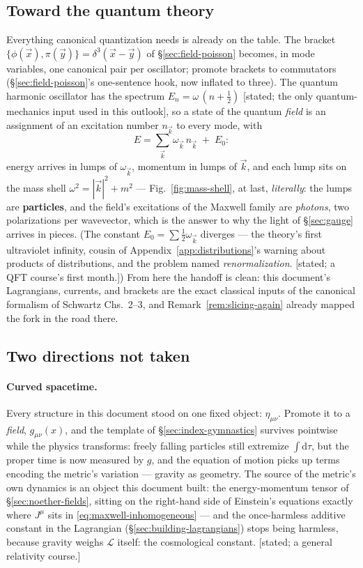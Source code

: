 \documentclass[11pt]{article}
\theoremstyle{plain}
\theoremstyle{definition}
\theoremstyle{remark}
\newcommand{\dd}{\mathrm{d}}
\newcommand{\vx}{\vec{x}}
\begin{document}
\subsection{Toward the quantum theory}
\label{sec:quantization-hook}

Everything canonical quantization needs is already on the table. The
bracket $\{\phi(\vx), \pi(\vec y)\} = \delta^3(\vx - \vec y)$ of
\S\ref{sec:field-poisson} becomes, in mode variables, one canonical
pair per oscillator; promote brackets to commutators
(\S\ref{sec:field-poisson}'s one-sentence hook, now inflated to
three). The quantum harmonic oscillator has the spectrum
$E_n = \omega\,(n + \tfrac12)$ [stated; the only quantum-mechanics
input used in this outlook], so a state of the quantum
\emph{field} is an assignment of an excitation number $n_{\vec k}$
to every mode, with
\begin{equation}
  E = \sum_{\vec k}\,\omega_{\vec k}\, n_{\vec k}
  \;+\; E_0 :
\end{equation}
energy arrives in lumps of $\omega_{\vec k}$, momentum in lumps of
$\vec k$, and each lump sits on the mass shell
$\omega^2 = |\vec k|^2 + m^2$ --- Fig.~\ref{fig:mass-shell}, at last,
\emph{literally}: the lumps are \textbf{particles}, and the field's
excitations of the Maxwell family are \emph{photons}, two
polarizations per wavevector, which is the answer to why the light
of \S\ref{sec:gauge} arrives in pieces. (The constant
$E_0 = \sum\tfrac12\omega_{\vec k}$ diverges --- the theory's first
ultraviolet infinity, cousin of Appendix~\ref{app:distributions}'s
warning about products of distributions, and the problem named
\emph{renormalization}. [stated; a QFT course's first month.]) From
here the handoff is clean: this document's Lagrangians, currents,
and brackets are the exact classical inputs of the canonical
formalism of Schwartz Chs.\ 2--3, and Remark~\ref{rem:slicing-again}
already mapped the fork in the road there.

\subsection{Two directions not taken}
\label{sec:two-doors}

\paragraph{Curved spacetime.} Every structure in this document stood
on one fixed object: $\eta_{\mu\nu}$. Promote it to a \emph{field},
$g_{\mu\nu}(x)$, and the template of \S\ref{sec:index-gymnastics}
survives pointwise while the physics transforms: freely falling
particles still extremize $\int\dd\tau$, but the proper time is now
measured by $g$, and the equation of motion picks up terms encoding
the metric's variation --- gravity as geometry. The source of the
metric's own dynamics is an object this document built: the
energy-momentum tensor of \S\ref{sec:noether-fields}, sitting on the
right-hand side of Einstein's equations exactly where $J^\mu$ sits
in \eqref{eq:maxwell-inhomogeneous} --- and the once-harmless
additive constant in the Lagrangian (\S\ref{sec:building-lagrangians})
stops being harmless, because gravity weighs $\mathcal L$ itself:
the cosmological constant. [stated; a general relativity course.]
\end{document}
